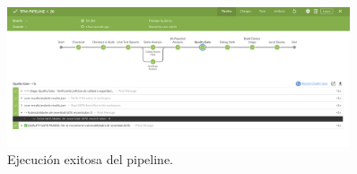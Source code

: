 \begin{figure}[H] 
    \centering
    \includegraphics[width=0.9\textwidth]{contenido/imagenes/4_pipeline_ok.png}
    \caption{Ejecución exitosa del pipeline.}
    \label{fig:pipeline_exitoso}
\end{figure}